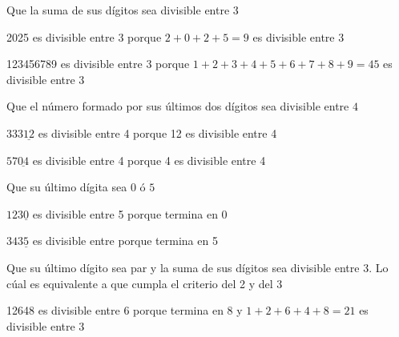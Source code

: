 \documentclass[11pt]{scrartcl}
\begin{document}
\begin{criterio*}
    Que la suma de sus dígitos sea divisible entre 3
\end{criterio*}
\begin{ejemplo*}
        2025 es divisible entre $3$ porque $2+0+2+5=9$ es divisible entre $3$
    \end{ejemplo*}
    \begin{ejemplo*}
        123456789 es divisible entre $3$ porque $1+2+3+4+5+6+7+8+9=45$ es divisible entre $3$
    \end{ejemplo*}
\begin{criterio*}
    Que el número formado por sus últimos dos dígitos sea divisible entre $4$
\end{criterio*}
\begin{ejemplo*}
    $333\underline{12}$ es divisible entre 4 porque 12 es divisible entre 4
\end{ejemplo*}
\begin{ejemplo*}
    $57\underline{04}$ es divisible entre 4 porque 4 es divisible entre 4
\end{ejemplo*}
\begin{criterio*}
    Que su último dígita sea $0$ ó $5$
\end{criterio*}
\begin{ejemplo*}
    $123\underline{0}$ es divisible entre 5 porque termina en 0
\end{ejemplo*}
\begin{ejemplo*}
    $343\underline{5}$ es divisible entre porque termina en 5
\end{ejemplo*}
\begin{criterio*}
    Que su último dígito sea par y la suma de sus dígitos sea divisible entre 3. Lo cúal es equivalente a que cumpla el criterio del 2 y del 3
\end{criterio*}
\begin{ejemplo*}
    12648 es divisible entre 6 porque termina en 8 y $1+2+6+4+8=21$ es divisible entre 3
\end{ejemplo*}
\end{document}

